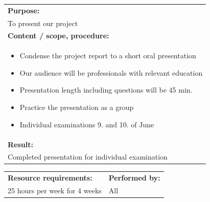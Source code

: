 \documentclass[12pt, a4paper]{article}
\begin{document}
\begin{tabularx}{\textwidth}{|X|}
	\textbf{Purpose:}\\
	 To present our project\\
	\hline
	\textbf{Content / scope, procedure:}\\
	\begin{itemize}
		\item Condense the project report to a short oral presentation
		\item Our audience will be professionals with relevant education
		\item Presentation length including questions will be 45 min.
		\item Practice the presentation as a group
		\item Individual examinations 9. and 10. of June
	\end{itemize}\\
 	\hline
	\textbf{Result:}\\
	Completed presentation for individual examination \\
	\hline
\end{tabularx}

\begin{tabularx}{\textwidth}{|X|p{30mm}|}
	\textbf{Resource requirements:}&\textbf{Performed by:}\\
	25 hours per week for 4 weeks&All\\
	\hline
\end{tabularx}

\egroup
\end{document}
